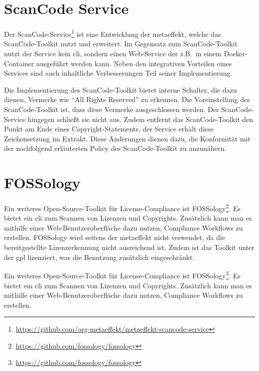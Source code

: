 \section{ScanCode Service}\label{sec:scancode-service}

Der ScanCode-Service\footnote{\url{https://github.com/org-metaeffekt/metaeffekt-scancode-service}} ist eine Entwicklung der metaeffekt, welche das ScanCode-Toolkit nutzt und erweitert.
Im Gegensatz zum ScanCode-Toolkit nutzt der Service kein \gls{cli}, sondern einen Web-Service der z.B.\ in einem Docker-Container ausgeführt werden kann.
Neben den integrativen Vorteilen eines Services sind auch inhaltliche Verbesserungen Teil seiner Implementierung.

Die Implementierung des ScanCode-Toolkit bietet interne Schalter, die dazu dienen, Vermerke wie \enquote{All Rights Reserved} zu erkennen.
Die Voreinstellung des ScanCode-Toolkit ist, dass diese Vermerke ausgeschlossen werden.
Der ScanCode-Service hingegen schließt sie nicht aus.
Zudem entfernt das ScanCode-Toolkit den Punkt am Ende eines Copyright-Statements, der Service erhält diese Zeichensetzung im Extrakt\autocite{noauthor_metaeffekt-scancode-service_2025}.
Diese Änderungen dienen dazu, die Konformität mit der nachfolgend erläuterten Policy des ScanCode-Toolkit zu anzunähern.


\section{FOSSology}\label{sec:fossology}

Ein weiteres Open-Source-Toolkit für License-Compliance ist FOSSology\footnote{\url{https://github.com/fossology/fossology}}.
Es bietet ein \gls{cli} zum Scannen von Lizenzen und Copyrights.
Zusätzlich kann man es mithilfe einer Web-Benutzeroberfläche dazu nutzen, Compliance Workflows zu erstellen.
FOSSology wird seitens der metaeffekt nicht verwendet, da die bereitgestellte Lizenzerkennung nicht ausreichend ist.
Zudem ist das Toolkit unter der \gls{gpl} lizenziert, was die Benutzung zusätzlich eingeschränkt.

Ein weiteres Open-Source-Toolkit für License-Compliance ist FOSSology\footnote{\url{https://github.com/fossology/fossology}}.
Es bietet ein \gls{cli} zum Scannen von Lizenzen und Copyrights.
Zusätzlich kann man es mithilfe einer Web-Benutzeroberfläche dazu nutzen, Compliance Workflows zu erstellen.

